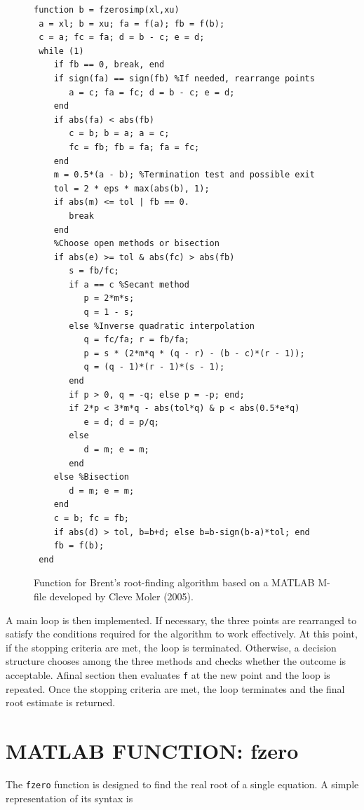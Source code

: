 \documentclass[../main.tex]{subfiles}
\begin{document}
\begin{figure}[h]
    \begin{lstlisting}[numbers=none]
 function b = fzerosimp(xl,xu)
 a = xl; b = xu; fa = f(a); fb = f(b);
 c = a; fc = fa; d = b - c; e = d;
 while (1)
    if fb == 0, break, end
    if sign(fa) == sign(fb) %If needed, rearrange points
       a = c; fa = fc; d = b - c; e = d;
    end
    if abs(fa) < abs(fb)
       c = b; b = a; a = c;
       fc = fb; fb = fa; fa = fc;
    end
    m = 0.5*(a - b); %Termination test and possible exit
    tol = 2 * eps * max(abs(b), 1);
    if abs(m) <= tol | fb == 0.
       break
    end
    %Choose open methods or bisection
    if abs(e) >= tol & abs(fc) > abs(fb)
       s = fb/fc;
       if a == c %Secant method
          p = 2*m*s;
          q = 1 - s;
       else %Inverse quadratic interpolation
          q = fc/fa; r = fb/fa;
          p = s * (2*m*q * (q - r) - (b - c)*(r - 1));
          q = (q - 1)*(r - 1)*(s - 1);
       end
       if p > 0, q = -q; else p = -p; end;
       if 2*p < 3*m*q - abs(tol*q) & p < abs(0.5*e*q)
          e = d; d = p/q;
       else
          d = m; e = m;
       end
    else %Bisection
       d = m; e = m;
    end
    c = b; fc = fb;
    if abs(d) > tol, b=b+d; else b=b-sign(b-a)*tol; end
    fb = f(b);
 end
    \end{lstlisting}
    \caption{Function for Brent's root-finding algorithm based on a MATLAB M-file developed by Cleve Moler
    (2005).}
\end{figure}

A main loop is then implemented. If necessary, the three points are rearranged to satisfy
the conditions required for the algorithm to work effectively. At this point, if the stopping
criteria are met, the loop is terminated. Otherwise, a decision structure chooses among the
three methods and checks whether the outcome is acceptable. Afinal section then evaluates
\texttt{f} at the new point and the loop is repeated. Once the stopping criteria are met, the loop
terminates and the final root estimate is returned.\\

\section[MATLAB FUNCTION: fzero]{MATLAB FUNCTION: fzero}
\noindent The \texttt{fzero} function is designed to find the real root of a single equation. A simple representation
of its syntax is\\
\end{document}
